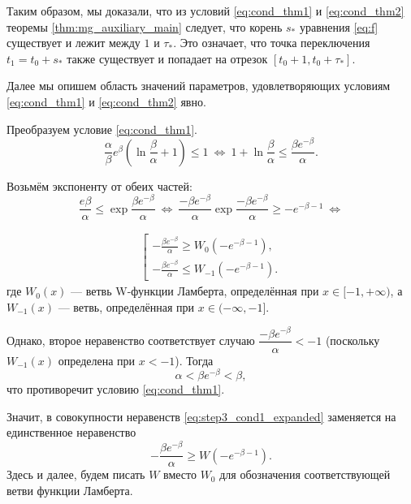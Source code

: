 Таким образом, мы доказали, что из условий \eqref{eq:cond_thm1} и \eqref{eq:cond_thm2} теоремы \ref{thm:mg_auxiliary_main} следует, что корень $s_*$ уравнения \eqref{eq:f} существует и лежит между $1$ и $\tau_*$. Это означает, что точка переключения $t_1 = t_0 + s_*$ также существует и попадает на отрезок $[t_0 + 1, t_0 + \tau_*]$.

Далее мы опишем область значений параметров, удовлетворяющих условиям \eqref{eq:cond_thm1} и \eqref{eq:cond_thm2} явно.

Преобразуем условие \eqref{eq:cond_thm1}.
\begin{equation*}
\frac{\alpha}{\beta}e^{\beta}\left(\ln\frac{\beta}{\alpha} + 1\right) \leqslant 1\ \Leftrightarrow\ 1 + \ln\dfrac{\beta}{\alpha} \leqslant \dfrac{\beta e^{-\beta}}{\alpha}.
\end{equation*}

Возьмём экспоненту от обеих частей:
\begin{equation*}
\dfrac{e\beta}{\alpha} \leqslant \exp\dfrac{\beta e^{-\beta}}{\alpha}\ \Leftrightarrow\ \dfrac{-\beta e^{-\beta}}{\alpha}\exp \dfrac{-\beta e^{-\beta}}{\alpha} \geqslant -e^{-\beta - 1}\ \Leftrightarrow
\end{equation*}

\begin{align}
\label{eq:step3_cond1_expanded}
\left[
\begin{array}{ll}
	-\frac{\beta e^{-\beta}}{\alpha} \geqslant W_0(-e^{-\beta - 1}),\\
	-\frac{\beta e^{-\beta}}{\alpha} \leqslant W_{-1}(-e^{-\beta - 1}).
\end{array}
\right.
\end{align}
%
где $W_0(x)$ --- ветвь W-функции Ламберта, определённая при $x \in [-1, +\infty)$, а $W_{-1}(x)$ --- ветвь, определённая при $x \in (-\infty, -1]$.

Однако, второе неравенство соответствует случаю $\dfrac{-\beta e^{-\beta}}{\alpha} < -1$ (поскольку $W_{-1}(x)$ определена при $x < -1$). Тогда
\begin{equation*}
\alpha < \beta e^{-\beta} < \beta,
\end{equation*}
что противоречит условию \eqref{eq:cond_thm1}.

Значит, в совокупности неравенств \eqref{eq:step3_cond1_expanded} заменяется на единственное неравенство
\begin{equation}
\label{eq:step3_cond1}
-\frac{\beta e^{-\beta}}{\alpha} \geqslant W(-e^{-\beta - 1}).
\end{equation}
Здесь и далее, будем писать $W$ вместо $W_0$ для обозначения соответствующей ветви функции Ламберта.

